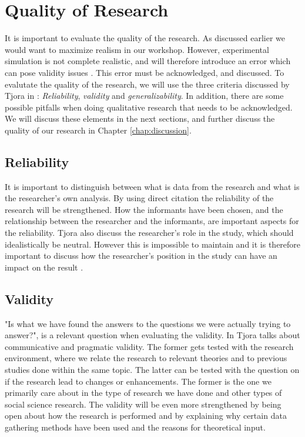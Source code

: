 \section{Quality of Research}
\label{sec:qualityresearch}
It is important to evaluate the quality of the research. As discussed earlier we would want to maximize realism in our workshop. However, experimental simulation is not complete realistic, and will therefore introduce an error which can pose validity issues \cite{alsos}.  This error must be acknowledged, and discussed. To evalutate the quality of the research, we will use the three criteria discussed by Tjora in \cite{tjora}:  \emph{Reliability}, \emph{validity} and \emph{generalizability}. In addition, there are some possible pitfalls when doing qualitative research that needs to be acknowledged. We will discuss these elements in the next sections, and further discuss the quality of our research in Chapter \ref{chap:discussion}.  

\subsection{Reliability}
It is important to distinguish between what is data from the research and what is the researcher's own analysis. By using direct citation the reliability of the research will be strengthened. How the informants have been chosen, and the relationship between the researcher and the informants, are important aspects for the reliability. Tjora also discuss the researcher's role in the study, which should idealistically be neutral. However this is impossible to maintain and it is therefore important to discuss how the researcher's position in the study can have an impact on the result \cite{tjora}.

\subsection{Validity}
"Is what we have found the answers to the questions we were actually trying to answer?", is a relevant question when evaluating the validity. In \cite{tjora} Tjora talks about communicative and pragmatic validity. The former gets tested with the research environment, where we relate the research to relevant theories and to previous studies done within the same topic. The latter can be tested with the question on if the research lead to changes or enhancements. The former is the one we primarily care about in the type of research we have done and other types of social science research. The validity will be even more strengthened by being open about how the research is performed and by explaining why certain data gathering methods have been used and the reasons for theoretical input. 

